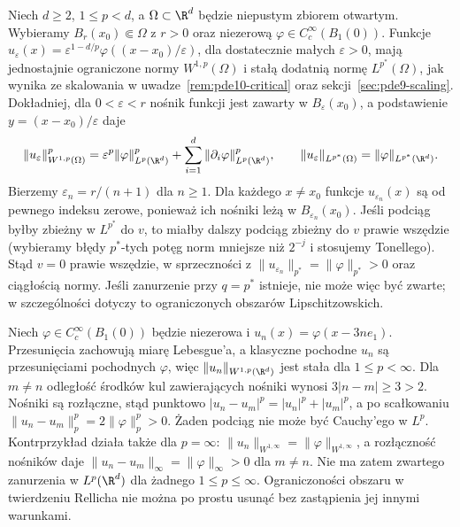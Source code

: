 \begin{kontrprzyklad}
\label{ex:pde10-noncompact-critical}
Niech $d\ge2$, $1\le p<d$, a $\Omega\subset\R^d$
będzie niepustym zbiorem otwartym. Wybieramy
$B_r(x_0)\Subset\Omega$ z $r>0$ oraz niezerową
$\varphi\in C_c^\infty(B_1(0))$.
Funkcje $u_\varepsilon(x)=\varepsilon^{1-d/p}
\varphi((x-x_0)/\varepsilon)$, dla dostatecznie małych
$\varepsilon>0$, mają jednostajnie ograniczone normy
$W^{1,p}(\Omega)$ i stałą dodatnią normę $L^{p^*}(\Omega)$,
jak wynika ze skalowania w uwadze~\ref{rem:pde10-critical}
oraz sekcji~\ref{sec:pde9-scaling}.
Dokładniej, dla $0<\varepsilon<r$ nośnik funkcji
jest zawarty w $B_\varepsilon(x_0)$, a podstawienie
$y=(x-x_0)/\varepsilon$ daje
\[
 \|u_\varepsilon\|_{W^{1,p}(\Omega)}^p
 =\varepsilon^p\|\varphi\|_{L^p(\R^d)}^p+
   \sum_{i=1}^d\|\partial_i\varphi\|_{L^p(\R^d)}^p,
 \qquad
 \|u_\varepsilon\|_{L^{p^*}(\Omega)}
 =\|\varphi\|_{L^{p^*}(\R^d)}.
\]
Bierzemy $\varepsilon_n=r/(n+1)$ dla $n\ge1$.
Dla każdego $x\ne x_0$ funkcje $u_{\varepsilon_n}(x)$
są od pewnego indeksu zerowe, ponieważ ich nośniki
leżą w $B_{\varepsilon_n}(x_0)$.
Jeśli podciąg byłby zbieżny w $L^{p^*}$ do $v$,
to miałby dalszy podciąg zbieżny do $v$ prawie
wszędzie (wybieramy błędy $p^*$-tych potęg norm
mniejsze niż $2^{-j}$ i stosujemy Tonellego).
Stąd $v=0$ prawie wszędzie, w sprzeczności z
$\|u_{\varepsilon_n}\|_{p^*}=\|\varphi\|_{p^*}>0$
oraz ciągłością normy. Jeśli zanurzenie przy $q=p^*$
istnieje, nie może więc być zwarte; w szczególności
dotyczy to ograniczonych obszarów Lipschitzowskich.
\end{kontrprzyklad}

\begin{kontrprzyklad}
\label{ex:pde10-translation}
Niech $\varphi\in C_c^\infty(B_1(0))$ będzie niezerowa
i $u_n(x)=\varphi(x-3ne_1)$.
Przesunięcia zachowują miarę Lebesgue'a, a klasyczne
pochodne $u_n$ są przesunięciami pochodnych $\varphi$,
więc $\|u_n\|_{W^{1,p}(\R^d)}$ jest stała dla
$1\le p<\infty$. Dla $m\ne n$ odległość środków
kul zawierających nośniki wynosi $3|n-m|\ge3>2$.
Nośniki są rozłączne, stąd punktowo
$|u_n-u_m|^p=|u_n|^p+|u_m|^p$, a po scałkowaniu
$\|u_n-u_m\|_p^p=2\|\varphi\|_p^p>0$.
Żaden podciąg nie może być Cauchy'ego w $L^p$.
Kontrprzykład działa także dla $p=\infty$:
$\|u_n\|_{W^{1,\infty}}=\|\varphi\|_{W^{1,\infty}}$,
a rozłączność nośników daje
$\|u_n-u_m\|_\infty=\|\varphi\|_\infty>0$ dla $m\ne n$.
Nie ma zatem zwartego zanurzenia w $L^p(\R^d)$
dla żadnego $1\le p\le\infty$.
Ograniczoności obszaru w twierdzeniu Rellicha nie można
po prostu usunąć bez zastąpienia jej innymi warunkami.
\end{kontrprzyklad}


